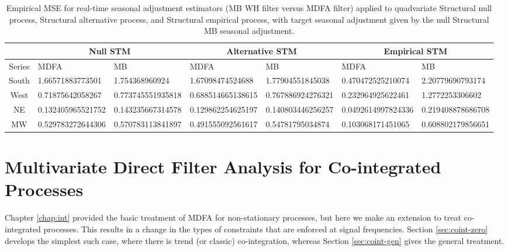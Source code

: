 \documentclass[a4paper]{book}
\begin{document}
 \begin{table}[]
\centering
\caption{Empirical MSE for real-time seasonal adjustment estimators (MB WH filter versus
 MDFA filter) applied to quadvariate Structural null process,  Structural
 alternative process,
 and Structural empirical process,  with target seasonal adjustment
 given by the null Structural MB seasonal adjustment.  }
\label{tab:starts.mat}
\begin{tabular}{cllllll}
\hline
& \multicolumn{2}{c}{Null STM} &\multicolumn{2}{c}{Alternative STM} &
  \multicolumn{2}{c}{Empirical STM} \\
\hline
  Series 	 &  MDFA    &  MB  &  MDFA    &  MB    &  MDFA    &  MB   \\
  South &   1.66571883773501 & 1.754368960924 & 
    1.67098474524688  &  1.77904551845038    &  
    0.470472525210074 &   2.20779690793174 \\
  West	 &   0.71875642058267 & 0.773745551935818 & 
    0.688514665138615  &  0.767886924276321    &  
    0.232964925622461 &   1.2772253306602 \\
  NE &   0.132405965521752 & 0.143235667314578 & 
    0.129862254625197  &  0.140803446256257    &  
    0.0492614997824336 &   0.219408878686708 \\
  MW	 &   0.529783272644306 & 0.570783113841897 & 
    0.491555092561617  &  0.54781795034874    &  
    0.103068171451065 &   0.608802179856651 \\
\hline      
\end{tabular}
\end{table}
 
  



\chapter{Multivariate Direct Filter Analysis for Co-integrated Processes}
\label{chap:coint}

Chapter \ref{chap:int} provided the basic treatment of MDFA for non-stationary
 processes, but here we make an extension to treat co-integrated processes.
 This results in a change in the types of constraints that are enforced
  at signal frequencies.  Section \ref{sec:coint-zero} develops the simplest such
  case, where there is trend (or classic) co-integration, whereas Section
  \ref{sec:coint-gen} gives the general treatment.
 
\end{document}
